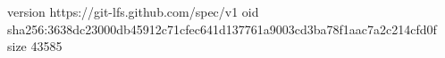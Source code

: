 version https://git-lfs.github.com/spec/v1
oid sha256:3638dc23000db45912c71cfec641d137761a9003cd3ba78f1aac7a2c214cfd0f
size 43585
